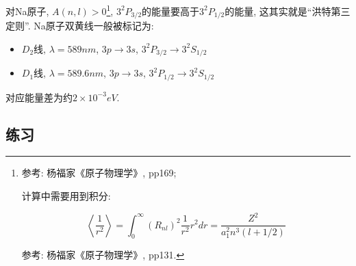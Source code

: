 对Na原子, $A(n,l)>0$\footnote{参考: 杨福家《原子物理学》, pp169;

计算中需要用到积分:

\begin{equation*}
\left\langle \frac{1}{r^2}\right\rangle = \int_0^{\infty} (R_{nl})^2
\frac{1}{r^2} r^2 dr = \frac{Z^2}{a_1^2 n^3 (l + 1/2)}
\end{equation*}

参考: 杨福家《原子物理学》, pp131.},
$3^2P_{3/2}$的能量要高于$3^2P_{1/2}$的能量,
这其实就是``洪特第三定则''. Na原子双黄线一般被标记为:


\begin{itemize}
  \item $D_2$线, $\lambda = 589 nm$, $3p \to 3s$, $3^2P_{3/2} \to 3^2S_{1/2}$
  \item $D_1$线, $\lambda = 589.6 nm$, $3p \to 3s$, $3^2P_{1/2} \to 3^2S_{1/2}$
\end{itemize}

对应能量差为约$2 \times 10^{-3}eV$.



\subsection*{练习}

